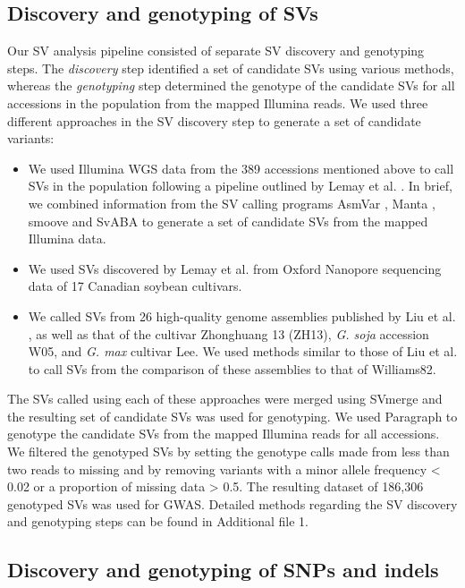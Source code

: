\documentclass{article}
\begin{document}
\subsection*{Discovery and genotyping of SVs}

Our SV analysis pipeline consisted of separate SV discovery and genotyping steps.
The \emph{discovery} step identified a set of candidate SVs using various methods,
whereas the \emph{genotyping} step determined the genotype
of the candidate SVs for all accessions in the population from the mapped Illumina reads. We used three different
approaches in the SV discovery step to generate a set of candidate variants:

\begin{itemize}
	\item We used Illumina WGS data from the 389 accessions mentioned above
		to call SVs in the population following a pipeline outlined
		by Lemay et al. \cite{lemay2022}. In brief, we combined information from
		the SV calling programs AsmVar \citep{liu2015}, Manta \citep{chen2016},
		smoove \citep{pedersen2019} and SvABA \citep{wala2018} to generate
		a set of candidate SVs from the mapped Illumina data.
	\item We used SVs discovered by Lemay et al. \cite{lemay2022} from Oxford Nanopore
		sequencing data of 17 Canadian soybean cultivars.
	\item We called SVs from 26 high-quality genome assemblies published by
		Liu et al. \cite{liu2020-pangenome}, as well as that of the cultivar Zhonghuang 13 (ZH13),
		\textit{G. soja} accession W05, and \textit{G. max} cultivar Lee.
		We used methods similar to those of Liu et al. \cite{liu2020-pangenome} to call
		SVs from the comparison of these assemblies to that of Williams82.
\end{itemize}

The SVs called using each of these approaches were merged using SVmerge
\citep{wong2010} and the resulting set of candidate SVs was used for
genotyping. We used Paragraph \citep{chen2019} to genotype the candidate SVs
from the mapped Illumina reads for all accessions. We filtered the genotyped
SVs by setting the genotype calls made from less than two reads to missing and
by removing variants with a minor allele frequency < 0.02 or a proportion of
missing data > 0.5. The resulting dataset of 186,306 genotyped SVs was used for
GWAS. Detailed methods regarding the SV discovery and genotyping steps can be
found in Additional file 1.

\subsection*{Discovery and genotyping of SNPs and indels}
\end{document}
